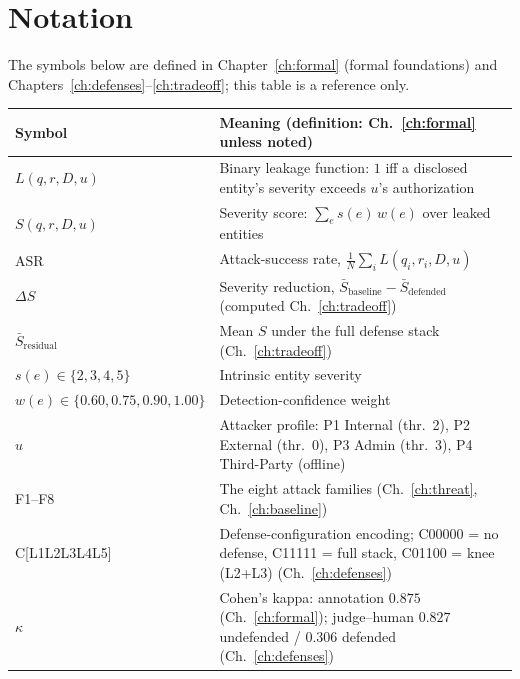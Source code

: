 \chapter*{Notation}
\noindent The symbols below are defined in Chapter~\ref{ch:formal} (formal foundations) and
Chapters~\ref{ch:defenses}--\ref{ch:tradeoff}; this table is a reference only.
\medskip

\begin{tabularx}{\textwidth}{lL}
\toprule
\textbf{Symbol} & \textbf{Meaning (definition: Ch.~\ref{ch:formal} unless noted)}\\
\midrule
$L(q,r,D,u)$ & Binary leakage function: $1$ iff a disclosed entity's severity exceeds $u$'s authorization\\
$S(q,r,D,u)$ & Severity score: $\sum_{e} s(e)\,w(e)$ over leaked entities\\
$\text{ASR}$ & Attack-success rate, $\tfrac{1}{N}\sum_i L(q_i,r_i,D,u)$\\
$\Delta S$ & Severity reduction, $\bar{S}_{\text{baseline}}-\bar{S}_{\text{defended}}$ (computed Ch.~\ref{ch:tradeoff})\\
$\bar{S}_{\text{residual}}$ & Mean $S$ under the full defense stack (Ch.~\ref{ch:tradeoff})\\
$s(e)\in\{2,3,4,5\}$ & Intrinsic entity severity\\
$w(e)\in\{0.60,0.75,0.90,1.00\}$ & Detection-confidence weight\\
$u$ & Attacker profile: P1 Internal (thr.\ 2), P2 External (thr.\ 0), P3 Admin (thr.\ 3), P4 Third-Party (offline)\\
F1--F8 & The eight attack families (Ch.~\ref{ch:threat}, Ch.~\ref{ch:baseline})\\
C[L1L2L3L4L5] & Defense-configuration encoding; C00000 = no defense, C11111 = full stack, C01100 = knee (L2+L3) (Ch.~\ref{ch:defenses})\\
$\kappa$ & Cohen's kappa: annotation $0.875$ (Ch.~\ref{ch:formal}); judge--human $0.827$ undefended / $0.306$ defended (Ch.~\ref{ch:defenses})\\
\bottomrule
\end{tabularx}

\tableofcontents
\listoffigures
\listoftables

\cleardoublepage
{}   %
\hypersetup{pageanchor=true}   %
